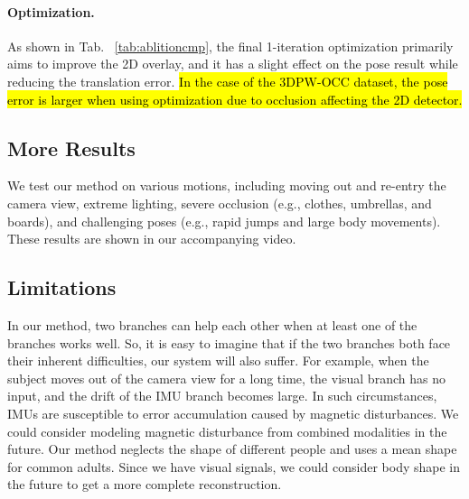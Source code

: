 \paragraph{Optimization.}
%
As shown in Tab. ~\ref{tab:ablitioncmp}, the final 1-iteration optimization primarily aims to improve the 2D overlay, and it has a slight effect on the pose result while reducing the translation error.
%
\hl{In the case of the 3DPW-OCC dataset, the pose error is larger when using optimization due to occlusion affecting the 2D detector.}
%
\subsection{More Results}\label{sec:moreResults}
We test our method on various motions, including moving out and re-entry the camera view, extreme lighting, severe occlusion (e.g., clothes, umbrellas, and boards), and challenging poses (e.g., rapid jumps and large body movements). These results are shown in our accompanying video.

\subsection{Limitations}\label{sec:limitations}
In our method, two branches can help each other when at least one of the branches works well.
%
So, it is easy to imagine that if the two branches both face their inherent difficulties, our system will also suffer.
%   
For example, when the subject moves out of the camera view for a long time, the visual branch has no input, and the drift of the IMU branch becomes large.
%
In such circumstances, IMUs are susceptible to error accumulation caused by magnetic disturbances.
%
We could consider modeling magnetic disturbance from combined modalities in the future.
%
Our method neglects the shape of different people and uses a mean shape for common adults.
%
Since we have visual signals, we could consider body shape in the future to get a more complete reconstruction.
%